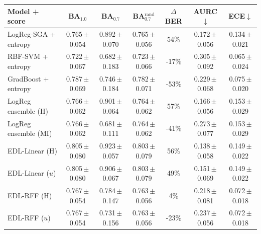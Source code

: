 \begin{tabular}{lcccccc}\toprule
Model + score & BA$_{1.0}$ & BA$_{0.7}$ & BA$_{0.7}^{\text{rand}}$ & $\Delta$BER & AURC$\downarrow$ & ECE$\downarrow$\\\midrule
LogReg-SGA + entropy & 0.765\,{\scriptsize$\pm$0.054} & 0.892\,{\scriptsize$\pm$0.070} & 0.765\,{\scriptsize$\pm$0.056} & 54\% & 0.172\,{\scriptsize$\pm$0.056} & 0.134\,{\scriptsize$\pm$0.021}\\
RBF-SVM + entropy & 0.722\,{\scriptsize$\pm$0.067} & 0.682\,{\scriptsize$\pm$0.183} & 0.723\,{\scriptsize$\pm$0.066} & -17\% & 0.305\,{\scriptsize$\pm$0.092} & 0.065\,{\scriptsize$\pm$0.024}\\
GradBoost + entropy & 0.787\,{\scriptsize$\pm$0.069} & 0.746\,{\scriptsize$\pm$0.184} & 0.782\,{\scriptsize$\pm$0.071} & -53\% & 0.229\,{\scriptsize$\pm$0.068} & 0.075\,{\scriptsize$\pm$0.020}\\
LogReg ensemble (H) & 0.766\,{\scriptsize$\pm$0.062} & 0.901\,{\scriptsize$\pm$0.064} & 0.764\,{\scriptsize$\pm$0.062} & 57\% & 0.166\,{\scriptsize$\pm$0.056} & 0.153\,{\scriptsize$\pm$0.029}\\
LogReg ensemble (MI) & 0.766\,{\scriptsize$\pm$0.062} & 0.681\,{\scriptsize$\pm$0.111} & 0.764\,{\scriptsize$\pm$0.062} & -41\% & 0.273\,{\scriptsize$\pm$0.077} & 0.153\,{\scriptsize$\pm$0.029}\\
EDL-Linear (H) & 0.805\,{\scriptsize$\pm$0.080} & 0.923\,{\scriptsize$\pm$0.057} & 0.803\,{\scriptsize$\pm$0.079} & 56\% & 0.138\,{\scriptsize$\pm$0.058} & 0.149\,{\scriptsize$\pm$0.022}\\
EDL-Linear ($u$) & 0.805\,{\scriptsize$\pm$0.080} & 0.906\,{\scriptsize$\pm$0.067} & 0.803\,{\scriptsize$\pm$0.079} & 49\% & 0.151\,{\scriptsize$\pm$0.069} & 0.149\,{\scriptsize$\pm$0.022}\\
EDL-RFF (H) & 0.767\,{\scriptsize$\pm$0.054} & 0.784\,{\scriptsize$\pm$0.147} & 0.763\,{\scriptsize$\pm$0.056} & 4\% & 0.218\,{\scriptsize$\pm$0.081} & 0.072\,{\scriptsize$\pm$0.018}\\
EDL-RFF ($u$) & 0.767\,{\scriptsize$\pm$0.054} & 0.731\,{\scriptsize$\pm$0.156} & 0.763\,{\scriptsize$\pm$0.056} & -23\% & 0.237\,{\scriptsize$\pm$0.056} & 0.072\,{\scriptsize$\pm$0.018}\\
\bottomrule\end{tabular}